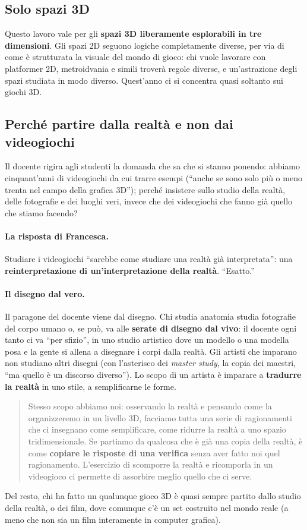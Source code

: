 \subsection{Solo spazi 3D}

Questo lavoro vale per gli \textbf{spazi 3D liberamente esplorabili in tre
dimensioni}. Gli spazi 2D seguono logiche completamente diverse, per via di come è
strutturata la visuale del mondo di gioco: chi vuole lavorare con platformer 2D,
metroidvania e simili troverà regole diverse, e un'astrazione degli spazi studiata in
modo diverso. Quest'anno ci si concentra quasi soltanto sui giochi 3D.

\subsection{Perché partire dalla realtà e non dai videogiochi}

Il docente rigira agli studenti la domanda che sa che si stanno ponendo: abbiamo
cinquant'anni di videogiochi da cui trarre esempi (``anche se sono solo più o meno
trenta nel campo della grafica 3D''); perché insistere sullo studio della realtà, delle
fotografie e dei luoghi veri, invece che dei videogiochi che fanno già quello che
stiamo facendo?

\paragraph{La risposta di Francesca.} Studiare i videogiochi ``sarebbe come studiare una
realtà già interpretata'': una \textbf{reinterpretazione di un'interpretazione della
realtà}. ``Esatto.''

\paragraph{Il disegno dal vero.} Il paragone del docente viene dal disegno. Chi studia
anatomia studia fotografie del corpo umano o, se può, va alle \textbf{serate di disegno
dal vivo}: il docente ogni tanto ci va ``per sfizio'', in uno studio artistico dove un
modello o una modella posa e la gente si allena a disegnare i corpi dalla realtà. Gli
artisti che imparano non studiano altri disegni (con l'asterisco dei \emph{master
study}, la copia dei maestri, ``ma quello è un discorso diverso''). Lo scopo di un
artista è imparare a \textbf{tradurre la realtà} in uno stile, a semplificarne le forme.
\begin{quote}
Stesso scopo abbiamo noi: osservando la realtà e pensando come la organizzeremo in un
livello 3D, facciamo tutta una serie di ragionamenti che ci insegnano come
semplificare, come ridurre la realtà a uno spazio tridimensionale. Se partiamo da
qualcosa che è già una copia della realtà, è come \textbf{copiare le risposte di una
verifica} senza aver fatto noi quel ragionamento. L'esercizio di scomporre la realtà e
ricomporla in un videogioco ci permette di assorbire meglio quello che ci serve.
\end{quote}
Del resto, chi ha fatto un qualunque gioco 3D è quasi sempre partito dallo studio della
realtà, o dei film, dove comunque c'è un set costruito nel mondo reale (a meno che non
sia un film interamente in computer grafica).

